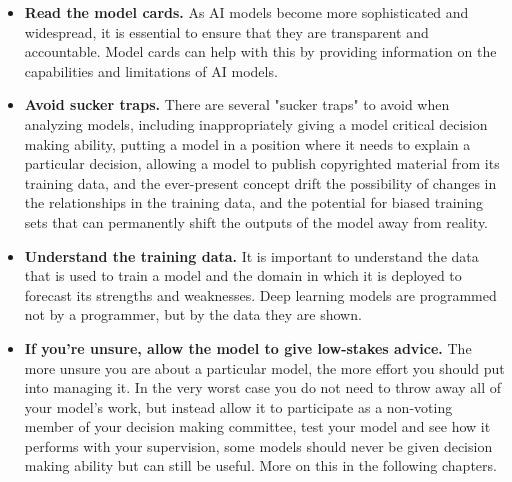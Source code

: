 \begin{itemize}
    \item \textbf{Read the model cards.} As AI models become more sophisticated and widespread, it is essential to ensure that they are transparent and accountable. Model cards can help with this by providing information on the capabilities and limitations of AI models.
    \item \textbf{Avoid sucker traps.} There are several "sucker traps" to avoid when analyzing models, including inappropriately giving a model critical decision making ability, putting a model in a position where it needs to explain a particular decision, allowing a model to publish copyrighted material from its training data, and the ever-present concept drift the possibility of changes in the relationships in the training data, and the potential for biased training sets that can permanently shift the outputs of the model away from reality.
    \item \textbf{Understand the training data.} It is important to understand the data that is used to train a model and the domain in which it is deployed to forecast its strengths and weaknesses. Deep learning models are programmed not by a programmer, but by the data they are shown.
    \item \textbf{If you're unsure, allow the model to give low-stakes advice.} The more unsure you are about a particular model, the more effort you should put into managing it. In the very worst case you do not need to throw away all of your model's work, but instead allow it to participate as a non-voting member of your decision making committee, test your model and see how it performs with your supervision, some models should never be given decision making ability but can still be useful. More on this in the following chapters.
\end{itemize}
